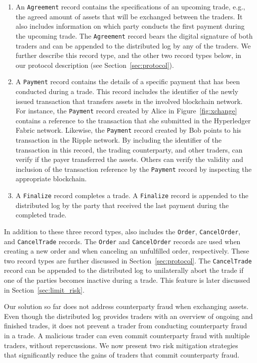 \begin{enumerate}
	\item An \texttt{Agreement} record contains the specifications of an upcoming trade, e.g., the agreed amount of assets that will be exchanged between the traders.
	It also includes information on which party conducts the first payment during the upcoming trade.
	The \texttt{Agreement} record bears the digital signature of both traders and can be appended to the distributed log by any of the traders.
	We further describe this record type, and the other two record types below, in our protocol description (see Section~\ref{sec:protocol}).
	\item A \texttt{Payment} record contains the details of a specific payment that has been conducted during a trade.
	This record includes the identifier of the newly issued transaction that transfers assets in the involved blockchain network.
	For instance, the \texttt{Payment} record created by Alice in Figure~\ref{fig:xchange} contains a reference to the transaction that she submitted in the Hyperledger Fabric network.
	Likewise, the \texttt{Payment} record created by Bob points to his transaction in the Ripple network.
	By including the identifier of the transaction in this record, the trading counterparty, and other traders, can verify if the payer transferred the assets.
	Others can verify the validity and inclusion of the transaction reference by the \texttt{Payment} record by inspecting the appropriate blockchain.
	\item A \texttt{Finalize} record completes a trade.
	A \texttt{Finalize} record is appended to the distributed log by the party that received the last payment during the completed trade.
\end{enumerate}

In addition to these three record types, \ModelName{} also includes the \texttt{Order}, \texttt{CancelOrder}, and \texttt{CancelTrade} records.
The \texttt{Order} and \texttt{CancelOrder} records are used when creating a new order and when canceling an unfulfilled order, respectively.
These two record types are further discussed in Section~\ref{sec:protocol}.
The \texttt{CancelTrade} record can be appended to the distributed log to unilaterally abort the trade if one of the parties becomes inactive during a trade.
This feature is later discussed in Section~\ref{sec:limit_risk}.

Our solution so far does not address counterparty fraud when exchanging assets.
Even though the distributed log provides traders with an overview of ongoing and finished trades, it does not prevent a trader from conducting counterparty fraud in a trade.
A malicious trader can even commit counterparty fraud with multiple traders, without repercussions.
We now present two risk mitigation strategies that significantly reduce the gains of traders that commit counterparty fraud.

